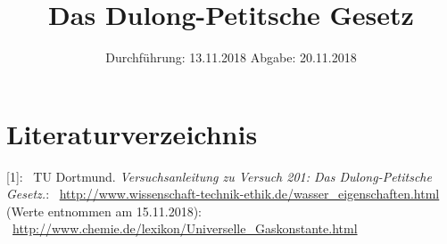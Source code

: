 

\subject{Nr.201}
\title{Das Dulong-Petitsche Gesetz}
\date{%
  Durchführung: 13.11.2018
  \hspace{3em}
  Abgabe: 20.11.2018
}



\maketitle
\thispagestyle{empty}
\tableofcontents
\newpage






\section {Literaturverzeichnis}

[1]: \ TU Dortmund. \textit{Versuchsanleitung zu Versuch 201: Das Dulong-Petitsche Gesetz.}\newline
[2]: \ \url{http://www.wissenschaft-technik-ethik.de/wasser_eigenschaften.html} \\ (Werte entnommen am 15.11.2018)\newline
[3]: \ \url{http://www.chemie.de/lexikon/Universelle_Gaskonstante.html}

\printbibliography{}


